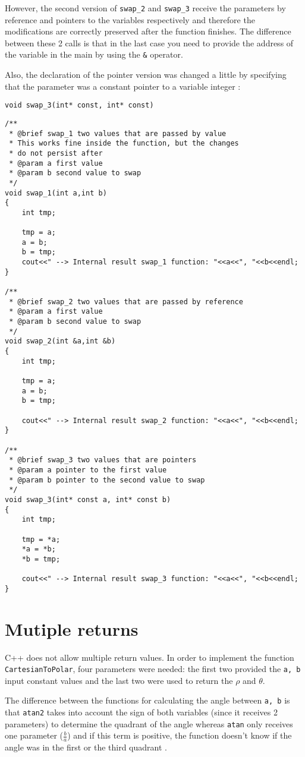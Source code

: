 \documentclass{article}
\begin{document}
However, the second version of \verb+swap_2+ and \verb+swap_3+  
receive the parameters
by reference and pointers to the variables respectively
and therefore the modifications are correctly preserved
after the function finishes. The difference between these 2 calls
is that in the last case you need to provide the address of the 
variable in the main by using the \verb+&+ operator.

Also, the declaration of the pointer version
was changed a little by specifying that the parameter was a constant 
pointer to a variable integer \cite{const}:

\verb+void swap_3(int* const, int* const)+ 

\begin{lstlisting}[label=lst_param,caption=Swap]
/**
 * @brief swap_1 two values that are passed by value
 * This works fine inside the function, but the changes
 * do not persist after
 * @param a first value
 * @param b second value to swap
 */
void swap_1(int a,int b)
{
	int tmp;

	tmp = a;
	a = b;
	b = tmp;
	cout<<" --> Internal result swap_1 function: "<<a<<", "<<b<<endl;
}

/**
 * @brief swap_2 two values that are passed by reference
 * @param a first value
 * @param b second value to swap
 */
void swap_2(int &a,int &b)
{
	int tmp;

	tmp = a;
	a = b;
	b = tmp;

	cout<<" --> Internal result swap_2 function: "<<a<<", "<<b<<endl;
}

/**
 * @brief swap_3 two values that are pointers
 * @param a pointer to the first value
 * @param b pointer to the second value to swap
 */
void swap_3(int* const a, int* const b)
{
	int tmp;

	tmp = *a;
	*a = *b;
	*b = tmp;

	cout<<" --> Internal result swap_3 function: "<<a<<", "<<b<<endl;
}
\end{lstlisting} 

\section{Mutiple returns}
C++ does not allow multiple return values.
In order to implement the function \verb+CartesianToPolar+, 
four parameters were needed:
the first two provided the \verb+a, b+ input constant values and the last
two were used to return the $\rho$ and $\theta$.

The difference between the functions for calculating the angle 
between \verb+a, b+ is that \verb+atan2+ takes into account the
sign of both variables (since it receives 2 parameters) 
to determine the quadrant of the angle
whereas \verb+atan+ only receives one parameter ($\frac{b}{a}$)
and if this term is positive, the function doesn't know if the 
angle was in the first or the third quadrant \cite{atan}.
\end{document}
